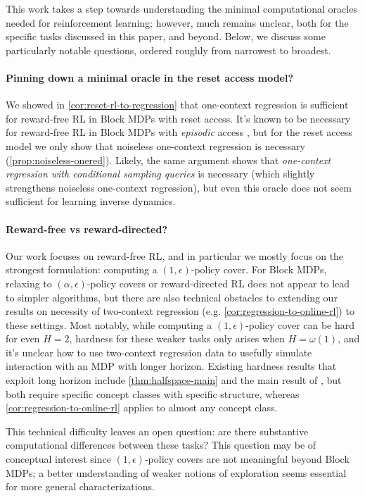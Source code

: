 This work takes a step towards understanding the minimal computational oracles needed for reinforcement learning; however, much remains unclear, both for the specific tasks discussed in this paper, and beyond. Below, we discuss some particularly notable questions, ordered roughly from narrowest to broadest.

\paragraph{Pinning down a minimal oracle in the reset access model?} We showed in \cref{cor:reset-rl-to-regression} that one-context regression is sufficient for reward-free RL in Block MDPs with reset access. It's known to be necessary for reward-free RL in Block MDPs with \emph{episodic} access \citep{golowich2024exploration}, but for the reset access model we only show that noiseless one-context regression is necessary (\cref{prop:noiseless-onered}). Likely, the same argument shows that \emph{one-context regression with conditional sampling queries} is necessary (which slightly strengthens noiseless one-context regression), but even this oracle does not seem sufficient for learning inverse dynamics.

\paragraph{Reward-free vs reward-directed?} Our work focuses on reward-free RL, and in particular we mostly focus on the strongest formulation: computing a $(1,\epsilon)$-policy cover. For Block MDPs, relaxing to $(\alpha,\epsilon)$-policy covers or reward-directed RL does not appear to lead to simpler algorithms, but there are also technical obstacles to extending our results on necessity of two-context regression (e.g. \cref{cor:regression-to-online-rl}) to these settings. Most notably, while computing a $(1,\epsilon)$-policy cover can be hard for even $H = 2$, hardness for these weaker tasks only arises when $H = \omega(1)$, and it's unclear how to use two-context regression data to usefully simulate interaction with an MDP with longer horizon. Existing hardness results that exploit long horizon include \cref{thm:halfspace-main} and the main result of \cite{golowich2024exploration}, but both require specific concept classes with specific structure, whereas \cref{cor:regression-to-online-rl} applies to almost any concept class.

This technical difficulty leaves an open question: are there substantive computational differences between these tasks? This question may be of conceptual interest since $(1,\epsilon)$-policy covers are not meaningful beyond Block MDPs; a better understanding of weaker notions of exploration seems essential for more general characterizations.

